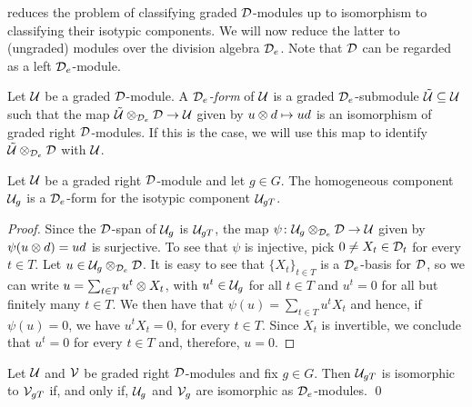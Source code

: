  reduces the problem of classifying graded $\mathcal{D}$-modules up to isomorphism to classifying their isotypic components. 
We will now reduce the latter to (ungraded) modules over the division algebra $\mathcal{D}_e$. 
Note that $\mathcal{D}$ can be regarded as a left $\mathcal{D}_e$-module.

\begin{defi}\label{def:D_e-form}
    Let $\mathcal U$ be a graded $\mathcal{D}$-module. 
    A \emph{$\mathcal{D}_e$-form} of $\mathcal U$ is a graded $\mathcal{D}_e$-submodule $\tilde {\mathcal U} \subseteq \mathcal U$ such that the map $\tilde {\mathcal U} \otimes_{\mathcal{D}_e} \mathcal{D} \to \mathcal U$ given by $u\otimes d \mapsto ud$ is an isomorphism of graded right $\mathcal{D}$-modules. 
    If this is the case, we will use this map to identify $\tilde {\mathcal U} \otimes_{\mathcal{D}_e} \mathcal{D}$ with $\mathcal U$. 
\end{defi}

\begin{prop}\label{prop:U_g-is-D_e-form}
    Let $\mathcal U$ be a graded right $\mathcal{D}$-module and let $g\in G$. 
    The homogeneous component $\mathcal U_g$ is a $\mathcal{D}_e$-form for the isotypic component $\mathcal U_{gT}$.
\end{prop}

\begin{proof}
    Since the $\mathcal{D}$-span of $\mathcal U_g$ is $\mathcal U_{gT}$, the map $\psi\colon \mathcal U_g \otimes_{\mathcal{D}_e} \mathcal{D} \to \mathcal U$ given by $\psi (u\otimes d) = ud$ is surjective. 
    To see that $\psi$ is injective, pick $0 \neq X_t \in \mathcal{D}_t$ for every $t\in T$. 
    Let $u \in \mathcal U_g \otimes_{\mathcal{D}_e} \mathcal{D}$. 
    It is easy to see that $\{ X_t\}_{t\in T}$ is a $\mathcal{D}_e$-basis for $\mathcal{D}$, so we can write $u = \sum_{t\in T} u^t \otimes X_t$, with $u^t \in \mathcal U_g$ for all $t\in T$ and $u^t = 0$ for all but finitely many $t\in T$. 
    We then have that $\psi (u) = \sum_{t\in T} u^t X_t$ and
    hence, if $\psi (u) = 0$, we have $u^t X_t = 0$, for every $t \in T$. 
    Since $X_t$ is invertible, we conclude that $u^t = 0$ for every $t\in T$ and, therefore, $u = 0$.
\end{proof}

\begin{cor}\label{cor:iso-isotypic-components}
    Let $\mathcal U$ and $\mathcal V$ be graded right $\mathcal{D}$-modules and fix $g\in G$. 
    Then $\mathcal U_{gT}$ is isomorphic to $\mathcal V_{gT}$ if, and only if, $\mathcal U_g$ and $\mathcal V_g$ are isomorphic as $\mathcal{D}_e$-modules. \qed
\end{cor}


